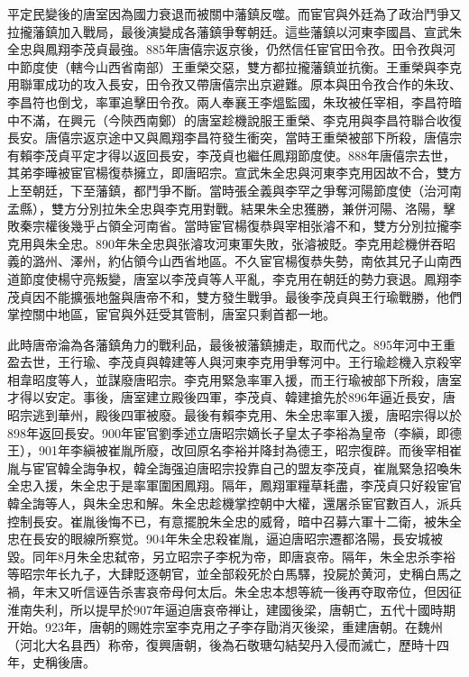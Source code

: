 平定民變後的唐室因為國力衰退而被關中藩鎮反噬。而宦官與外廷為了政治鬥爭又拉攏藩鎮加入戰局，最後演變成各藩鎮爭奪朝廷。這些藩鎮以河東李國昌、宣武朱全忠與鳳翔李茂貞最強。885年唐僖宗返京後，仍然信任宦官田令孜。田令孜與河中節度使（轄今山西省南部）王重榮交惡，雙方都拉攏藩鎮並抗衡。王重榮與李克用聯軍成功的攻入長安，田令孜又帶唐僖宗出京避難。原本與田令孜合作的朱玫、李昌符也倒戈，率軍追擊田令孜。兩人奉襄王李熅監國，朱玫被任宰相，李昌符暗中不滿，在興元（今陝西南鄭）的唐室趁機說服王重榮、李克用與李昌符聯合收復長安。唐僖宗返京途中又與鳳翔李昌符發生衝突，當時王重榮被部下所殺，唐僖宗有賴李茂貞平定才得以返回長安，李茂貞也繼任鳳翔節度使。888年唐僖宗去世，其弟李曄被宦官楊復恭擁立，即唐昭宗。宣武朱全忠與河東李克用因故不合，雙方上至朝廷，下至藩鎮，都鬥爭不斷。當時張全義與李罕之爭奪河陽節度使（治河南孟縣），雙方分別拉朱全忠與李克用對戰。結果朱全忠獲勝，兼併河陽、洛陽，擊敗秦宗權後幾乎占領全河南省。當時宦官楊復恭與宰相张濬不和，雙方分別拉攏李克用與朱全忠。890年朱全忠與张濬攻河東軍失敗，张濬被貶。李克用趁機併吞昭義的潞州、澤州，約佔領今山西省地區。不久宦官楊復恭失勢，南依其兄子山南西道節度使楊守亮叛變，唐室以李茂貞等人平亂，李克用在朝廷的勢力衰退。鳳翔李茂貞因不能擴張地盤與唐帝不和，雙方發生戰爭。最後李茂貞與王行瑜戰勝，他們掌控關中地區，宦官與外廷受其管制，唐室只剩首都一地。

此時唐帝淪為各藩鎮角力的戰利品，最後被藩鎮擄走，取而代之。895年河中王重盈去世，王行瑜、李茂貞與韓建等人與河東李克用爭奪河中。王行瑜趁機入京殺宰相韋昭度等人，並謀廢唐昭宗。李克用緊急率軍入援，而王行瑜被部下所殺，唐室才得以安定。事後，唐室建立殿後四軍，李茂貞、韓建搶先於896年逼近長安，唐昭宗逃到華州，殿後四軍被廢。最後有賴李克用、朱全忠率軍入援，唐昭宗得以於898年返回長安。900年宦官劉季述立唐昭宗嫡长子皇太子李裕為皇帝（李縝，即德王），901年李縝被崔胤所廢，改回原名李裕并降封為德王，昭宗復辟。而後宰相崔胤与宦官韓全誨争权，韓全誨强迫唐昭宗投靠自己的盟友李茂貞，崔胤緊急招喚朱全忠入援，朱全忠于是率軍圍困鳳翔。隔年，鳳翔軍糧草耗盡，李茂貞只好殺宦官韓全誨等人，與朱全忠和解。朱全忠趁機掌控朝中大權，還屠杀宦官數百人，派兵控制長安。崔胤後悔不已，有意擺脫朱全忠的威脅，暗中召募六軍十二衛，被朱全忠在長安的眼線所察觉。904年朱全忠殺崔胤，逼迫唐昭宗遷都洛陽，長安城被毀。同年8月朱全忠弑帝，另立昭宗子李柷为帝，即唐哀帝。隔年，朱全忠杀李裕等昭宗年长九子，大肆貶逐朝官，並全部殺死於白馬驛，投屍於黄河，史稱白馬之禍，年末又听信诬告杀害哀帝母何太后。朱全忠本想等統一後再夺取帝位，但因征淮南失利，所以提早於907年逼迫唐哀帝禅让，建國後梁，唐朝亡，五代十國時期开始。923年，唐朝的赐姓宗室李克用之子李存勖消灭後梁，重建唐朝。在魏州（河北大名县西）称帝，復興唐朝，後為石敬瑭勾結契丹入侵而滅亡，歷時十四年，史稱後唐。


